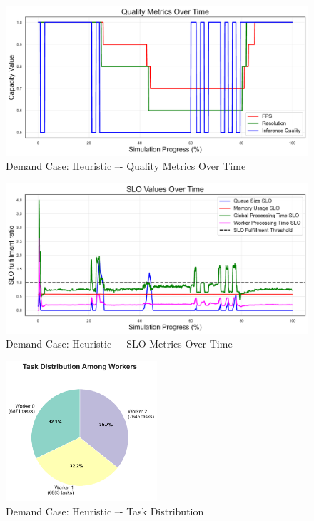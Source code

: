 \begin{figure}[h]
    \centering
    \includegraphics[width=\textwidth]{img/results/variable_computational_demand/heuristic_quality_metrics.pdf}
    \caption{Demand Case: Heuristic –- Quality Metrics Over Time}
\end{figure}
\begin{figure}[h]
    \centering
    \includegraphics[width=\textwidth]{img/results/variable_computational_demand/heuristic_slo_values.pdf}
    \caption{Demand Case: Heuristic –- SLO Metrics Over Time}
\end{figure}
\begin{figure}[h]
    \centering
    \includegraphics[width=0.5\textwidth]{img/results/variable_computational_demand/heuristic_task_distribution_pie.pdf}
    \caption{Demand Case: Heuristic –- Task Distribution}
\end{figure}

